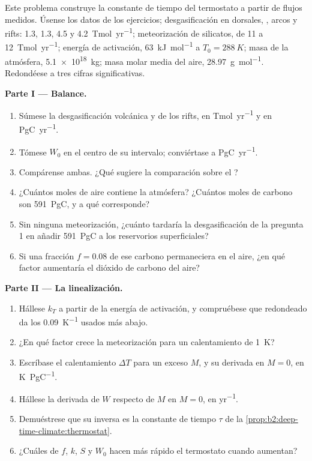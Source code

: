 \begin{problem}\label{pb:b2:deep-time-climate:1}
Este problema construye la constante de tiempo del termostato a partir de flujos medidos. Úsense los datos de los
ejercicios; desgasificación en dorsales, , arcos y rifts: \num{1.3}, \num{1.3}, 4.5 y
\qty{4.2}{Tmol.yr^{-1}}; meteorización de silicatos, de 11 a \qty{12}{Tmol.yr^{-1}}; energía de activación,
\qty{63}{kJ.mol^{-1}} a $T_0 = \qty{288}{K}$; masa de la atmósfera, \qty{5.1e18}{kg}; masa molar media
del aire, \qty{28.97}{g.mol^{-1}}. Redondéese a tres cifras significativas.

\noindent\textbf{Parte I --- Balance.}
\begin{enumerate}
  \item Súmese la desgasificación volcánica y de los rifts, en \unit{Tmol.yr^{-1}} y en \unit{PgC.yr^{-1}}.
  \item Tómese $W_0$ en el centro de su intervalo; conviértase a \unit{PgC.yr^{-1}}.
  \item Compárense ambas. ¿Qué sugiere la comparación sobre el ?
  \item ¿Cuántos moles de aire contiene la atmósfera? ¿Cuántos moles de carbono son \qty{591}{PgC},
        y a qué  corresponde?
  \item Sin ninguna meteorización, ¿cuánto tardaría la desgasificación de la pregunta 1 en añadir
        \qty{591}{PgC} a los reservorios superficiales?
  \item Si una fracción $f = 0.08$ de ese carbono permaneciera en el aire, ¿en qué factor aumentaría el dióxido de carbono
        del aire?
\end{enumerate}

\noindent\textbf{Parte II --- La linealización.}
\begin{enumerate}[resume]
  \item Hállese $k_T$ a partir de la energía de activación, y compruébese que redondeado da los
        \qty{0.09}{K^{-1}} usados más abajo.
  \item ¿En qué factor crece la meteorización para un calentamiento de \qty{1}{K}?
  \item Escríbase el calentamiento $\Delta T$ para un exceso $M$, y su derivada en $M = 0$, en
        \unit{K.PgC^{-1}}.
  \item Hállese la derivada de $W$ respecto de $M$ en $M = 0$, en \unit{yr^{-1}}.
  \item Demuéstrese que su inversa es la constante de tiempo $\tau$ de la
        \cref{prop:b2:deep-time-climate:thermostat}.
  \item ¿Cuáles de $f$, $k$, $S$ y $W_0$ hacen más rápido el termostato cuando aumentan?
\end{enumerate}


\end{problem}

